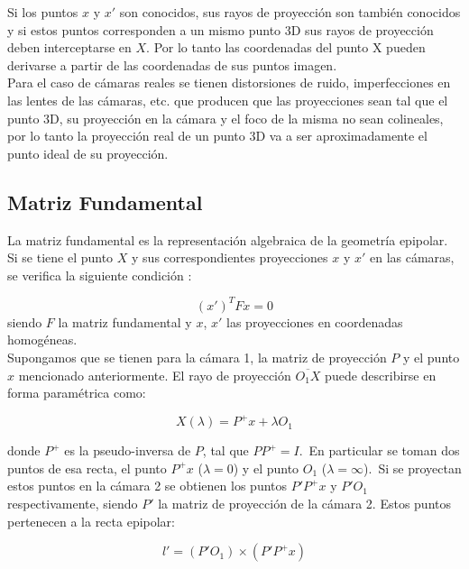 Si los puntos $x$ y $x'$ son conocidos, sus rayos de proyección son también conocidos y si estos puntos corresponden a un mismo punto 3D sus rayos de proyección deben interceptarse en $X$. Por lo tanto las coordenadas del punto X pueden derivarse a partir de las coordenadas de sus puntos imagen.\\
 
Para el caso de cámaras reales se tienen distorsiones de ruido, imperfecciones en las lentes de las cámaras, etc. que producen que las proyecciones sean tal que el punto 3D, su proyección en la cámara y el foco de la misma no sean colineales, por lo tanto la proyección real de un punto 3D va a ser aproximadamente el punto ideal de su proyección. \\

\subsection{Matriz Fundamental}

La matriz fundamental es la representación algebraica de la geometría epipolar. Si se tiene el punto $X$ y sus correspondientes proyecciones $x$ y $x'$ en las cámaras, se verifica la siguiente condición :

\begin{equation}
(x')^T F x = 0
\label{ec: matriz fundamental}
\end{equation}
siendo  $F$ la matriz fundamental y $x$, $x'$ las proyecciones en coordenadas homogéneas.\\

Supongamos que se tienen para la cámara 1, la matriz de proyección $P$ y el punto $x$ mencionado anteriormente. El rayo de proyección $\overline{O_1X}$  puede describirse en forma paramétrica como:

\begin{equation}
	X(\lambda) = P^+x+\lambda O_1
\end{equation}

\hspace{-0.6cm}donde $P^+$ es la pseudo-inversa de $P$, tal que $PP^+=I$.\
En particular se toman dos puntos de esa recta, el punto $P^+x$ ($\lambda = 0$) y el punto $O_1$ ($\lambda = \infty$).\
Si se proyectan estos puntos en la cámara 2 se obtienen los puntos $P'P^+x$ y $P'O_1$ respectivamente, siendo $P'$ la matriz de proyección de la cámara 2. Estos puntos pertenecen a la recta epipolar:

\begin{equation}
l' = (P'O_1) \times (P'P^+ x)
\end{equation}

